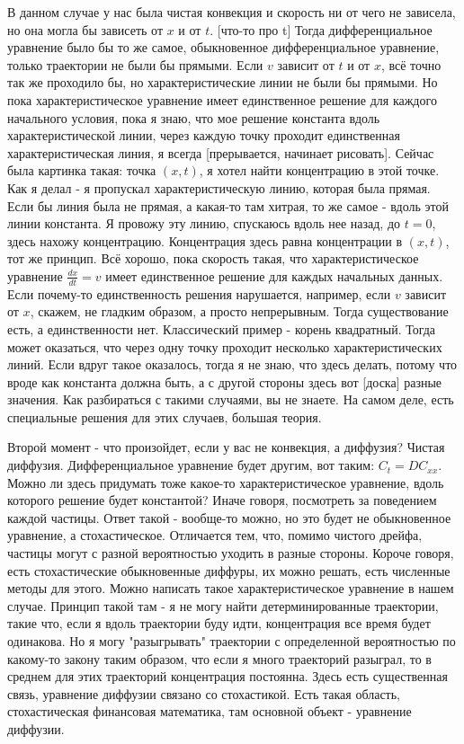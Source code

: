 В данном случае у нас была чистая конвекция и скорость ни от чего не зависела, но она могла бы зависеть от $x$ и от $t$. [что-то про t] Тогда дифференциальное уравнение было бы то же самое, обыкновенное дифференциальное уравнение, только траектории не были бы прямыми. Если $v$ зависит от $t$ и от $x$, всё точно так же проходило бы, но характеристические линии не были бы прямыми. Но пока характеристическое уравнение имеет единственное решение для каждого начального условия, пока я знаю, что мое решение константа вдоль характеристической линии, через каждую точку проходит единственная характеристическая линия, я всегда [прерывается, начинает рисовать]. Сейчас была картинка такая: точка $(x, t)$, я хотел найти концентрацию в этой точке. Как я делал - я пропускал характеристическую линию, которая была прямая. Если бы линия была не прямая, а какая-то там хитрая, то же самое - вдоль этой линии константа. Я провожу эту линию, спускаюсь вдоль нее назад, до $t = 0$, здесь нахожу концентрацию. Концентрация здесь равна концентрации в $(x, t)$, тот же принцип. 
Всё хорошо, пока скорость такая, что характеристическое уравнение $\frac{dx}{dt} = v$ имеет единственное решение для каждых начальных данных. Если почему-то единственность решения нарушается, например, если $v$ зависит от $x$, скажем, не гладким образом, а просто непрерывным. Тогда существование есть, а единственности нет. Классический пример - корень квадратный. Тогда может оказаться, что через одну точку проходит несколько характеристических линий. Если вдруг такое оказалось, тогда я не знаю, что здесь делать, потому что вроде как константа должна быть, а с другой стороны здесь вот [доска] разные значения. Как разбираться с такими случаями, вы не знаете. На самом деле, есть специальные решения для этих случаев, большая теория.

Второй момент - что произойдет, если у вас не конвекция, а диффузия? Чистая диффузия. Дифференциальное уравнение будет другим, вот таким: $C_t = DC_{xx}$. Можно ли здесь придумать тоже какое-то характеристическое уравнение, вдоль которого решение будет константой? Иначе говоря, посмотреть за поведением каждой частицы. Ответ такой - вообще-то можно, но это будет не обыкновенное уравнение, а стохастическое. Отличается тем, что, помимо чистого дрейфа, частицы могут с разной вероятностью уходить в разные стороны. Короче говоря, есть стохастические обыкновенные диффуры, их можно решать, есть численные методы для этого.
Можно написать такое характеристическое уравнение в нашем случае. Принцип такой там - я не могу найти детерминированные траектории, такие что, если я вдоль траектории буду идти, концентрация все время будет одинакова. Но я могу "разыгрывать" траектории с определенной вероятностью по какому-то закону таким образом, что если я много траекторий разыграл, то в среднем для этих траекторий концентрация постоянна. Здесь есть существенная связь, уравнение диффузии связано со стохастикой. Есть такая область, стохастическая финансовая математика, там основной объект - уравнение диффузии.

